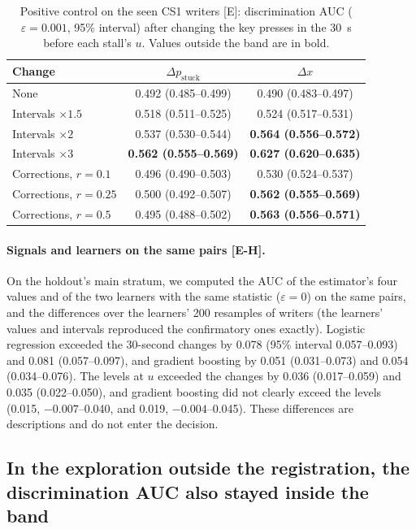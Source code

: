 \begin{table}
  \caption{Positive control on the seen CS1 writers [E]: discrimination AUC ($\varepsilon = 0.001$, 95\% interval) after
  changing the key presses in the 30~s before each stall's $u$. Values outside the band are in bold.}
  \label{tab:poscontrol}
  \centering\small
  \begin{tabular}{l c c}
    \toprule
    Change & $\Delta p_{\mathrm{stuck}}$ & $\Delta x$ \\
    \midrule
    None & 0.492 (0.485--0.499) & 0.490 (0.483--0.497) \\
    Intervals $\times 1.5$ & 0.518 (0.511--0.525) & 0.524 (0.517--0.531) \\
    Intervals $\times 2$ & 0.537 (0.530--0.544) & \textbf{0.564 (0.556--0.572)} \\
    Intervals $\times 3$ & \textbf{0.562 (0.555--0.569)} & \textbf{0.627 (0.620--0.635)} \\
    Corrections, $r = 0.1$ & 0.496 (0.490--0.503) & 0.530 (0.524--0.537) \\
    Corrections, $r = 0.25$ & 0.500 (0.492--0.507) & \textbf{0.562 (0.555--0.569)} \\
    Corrections, $r = 0.5$ & 0.495 (0.488--0.502) & \textbf{0.563 (0.556--0.571)} \\
    \bottomrule
  \end{tabular}
\end{table}

\paragraph{Signals and learners on the same pairs [E-H].} On the holdout's main stratum, we computed the AUC of the
estimator's four values and of the two learners with the same statistic ($\varepsilon = 0$) on the same pairs, and the
differences over the learners' 200 resamples of writers (the learners' values and intervals reproduced the confirmatory
ones exactly). Logistic regression exceeded the 30-second changes by 0.078 (95\% interval 0.057--0.093) and 0.081
(0.057--0.097), and gradient boosting by 0.051 (0.031--0.073) and 0.054 (0.034--0.076). The levels at $u$ exceeded the
changes by 0.036 (0.017--0.059) and 0.035 (0.022--0.050), and gradient boosting did not clearly exceed the levels
(0.015, $-0.007$--0.040, and 0.019, $-0.004$--0.045). These differences are descriptions and do not enter the decision.

\subsection{In the exploration outside the registration, the discrimination AUC also stayed inside the band}
\label{sec:res-explore}

